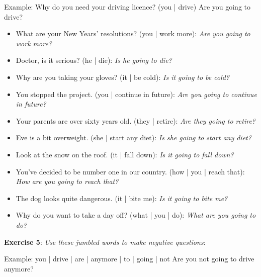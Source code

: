 Example:
Why do you need your driving licence? (you | drive)
Are you going to drive?

\begin{itemize}

\item What are your New Years' resolutions? (you | work more): \textit{Are you going to work more?}
\item Doctor, is it serious? (he | die): \textit{Is he going to die?}
\item Why are you taking your gloves? (it | be cold): \textit{Is it going to be cold?}
\item You stopped the project. (you | continue in future): \textit{Are you going to continue in future?}
\item Your parents are over sixty years old. (they | retire): \textit{Are they going to retire?}
\item Eve is a bit overweight. (she | start any diet): \textit{Is she going to start any diet?}
\item Look at the snow on the roof. (it | fall down): \textit{Is it going to fall down?}
\item You've decided to be number one in our country. (how | you | reach that): \textit{How are you going to reach that?}
\item The dog looks quite dangerous. (it | bite me): \textit{Is it going to bite me?}
\item Why do you want to take a day off? (what | you | do): \textit{What are you going to do?}

\end{itemize}

\textbf{Exercise 5}: \textit{Use these jumbled words to make negative questions}:

Example:
you | drive | are | anymore | to | going | not
Are you not going to drive anymore?


